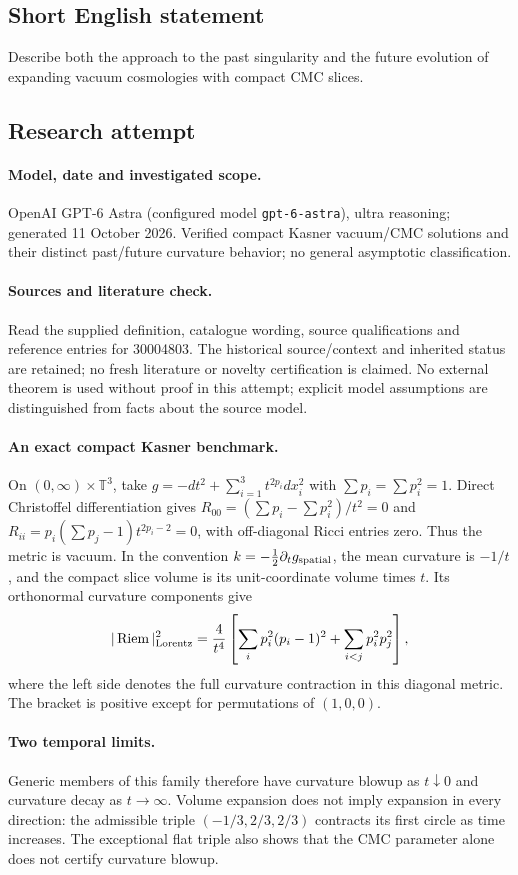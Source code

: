 \documentclass[11pt]{article}
\begin{document}
\subsection{Short English statement}
Describe both the approach to the past singularity and the future evolution of expanding vacuum cosmologies with compact CMC slices.
\subsection{Research attempt}
\paragraph{Model, date and investigated scope.}
OpenAI GPT-6 Astra (configured model \texttt{gpt-6-astra}), ultra reasoning; generated 11 October 2026. Verified compact Kasner vacuum/CMC solutions and their distinct past/future curvature behavior; no general asymptotic classification.

\paragraph{Sources and literature check.}
Read the supplied definition, catalogue wording, source qualifications and reference entries for 30004803. The historical source/context and inherited status are retained; no fresh literature or novelty certification is claimed. No external theorem is used without proof in this attempt; explicit model assumptions are distinguished from facts about the source model.

\paragraph{An exact compact Kasner benchmark.} On \((0,\infty)\times\mathbb T^3\), take \(g=-dt^2+\sum_{i=1}^3t^{2p_i}dx_i^2\) with \(\sum p_i=\sum p_i^2=1\). Direct Christoffel differentiation gives \(R_{00}=(\sum p_i-\sum p_i^2)/t^2=0\) and \(R_{ii}=p_i(\sum p_j-1)t^{2p_i-2}=0\), with off-diagonal Ricci entries zero. Thus the metric is vacuum. In the convention \(k=-\frac12\partial_tg_{\rm spatial}\), the mean curvature is \(-1/t\), and the compact slice volume is its unit-coordinate volume times \(t\).
Its orthonormal curvature components give
\[
 |\operatorname{Riem}|_{\rm Lorentz}^2
 =\frac4{t^4}\left[\sum_i p_i^2(p_i-1)^2+\sum_{i<j}p_i^2p_j^2\right],
\]
where the left side denotes the full curvature contraction in this diagonal metric. The bracket is positive except for permutations of \((1,0,0)\).
\paragraph{Two temporal limits.} Generic members of this family therefore have curvature blowup as \(t\downarrow0\) and curvature decay as \(t\to\infty\). Volume expansion does not imply expansion in every direction: the admissible triple \((-1/3,2/3,2/3)\) contracts its first circle as time increases. The exceptional flat triple also shows that the CMC parameter alone does not certify curvature blowup.
\end{document}
